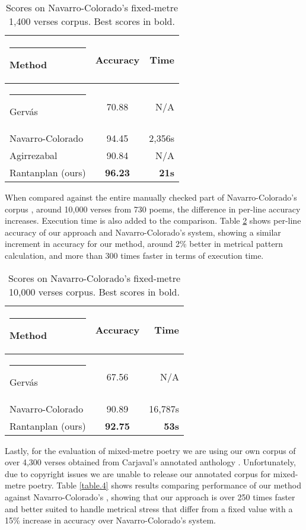 \documentclass[a4paper,11pt,twocolumn,twoside]{article}
\begin{document}
\begin{table} [htbp]
\begin{center}
\begin{tabular} {lcr}
  \hline\rule{-2pt}{15pt}
  {\bf Method} & {\bf Accuracy} & {\bf Time}\\
  \hline\rule{-4pt}{10pt}
Gervás\footnotemark & 70.88 & N/A \\
Navarro-Colorado & 94.45 & 2,356s \\
Agirrezabal & 90.84 & N/A\\
Rantanplan (ours) & \textbf{96.23} & \textbf{21s} \\
\hline
\end{tabular}
\end{center}
\caption{\label{table.2}Scores on Navarro-Colorado's fixed-metre 1,400 verses corpus. Best scores in bold.}
\end{table}

When compared against the entire manually checked part of  Navarro-Colorado's corpus , around 10,000 verses from 730 poems, the difference in per-line accuracy increases. Execution time is also added to the comparison. Table \ref{table.3} shows per-line accuracy of our approach and Navarro-Colorado's system, showing a similar increment in accuracy for our method, around 2\% better in metrical pattern calculation, and more than 300 times faster in terms of execution time.

\begin{table} [htbp]
\begin{center}
\begin{tabular} {lcr}
  \hline\rule{-2pt}{15pt}
  {\bf Method} & {\bf Accuracy} & {\bf Time}\\
  \hline\rule{-4pt}{10pt}
Gervás\footnotemark & 67.56 & N/A \\
Navarro-Colorado & 90.89 & 16,787s \\
Rantanplan (ours) & \textbf{92.75} & \textbf{53s}\\
\hline
\end{tabular}
\end{center}
\caption{\label{table.3}Scores on Navarro-Colorado's fixed-metre 10,000 verses corpus. Best scores in bold.}
\end{table}

Lastly, for the evaluation of mixed-metre poetry we are using our own corpus of over 4,300 verses obtained from Carjaval's annotated anthology . Unfortunately, due to copyright issues we are unable to release our annotated corpus for mixed-metre poetry. Table \ref{table.4} shows results comparing performance of our method against Navarro-Colorado's , showing that our approach is over 250 times faster and better suited to handle metrical stress that differ from a fixed value with a 15\% increase in accuracy over Navarro-Colorado's system.
\end{document}
